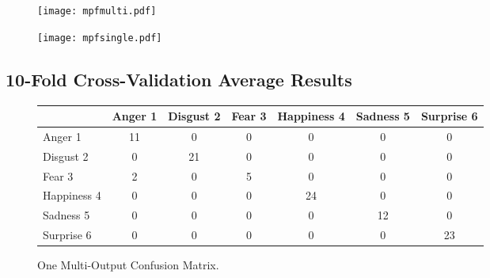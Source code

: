 \documentclass[a4paper,11pt]{article}
\begin{document}
 \begin{figure}[h]                                                               
 \begin{center}                                                                  
           \texttt{[image: mpfmulti.pdf]}                                       
 \end{center}                                                                    
 \end{figure} 
 
  \begin{figure}[h]                                                               
 \begin{center}                                                                  
           \texttt{[image: mpfsingle.pdf]}                                      
 \end{center}                                                                    
 \end{figure} 


\subsection{10-Fold Cross-Validation Average Results}


\begin{figure}[h]                                                               
\begin{center}                                                                  
     \begin{tabular}{ | l || c | c | c | c | c | c | }                           
     \hline                                                                      
           & Anger 1 & Disgust 2 & Fear 3 & Happiness 4 & Sadness 5 & Surprise 6 \\ \hline \hline
         Anger 1 		& 11 & 0 & 0 & 0 & 0 & 0 \\ \hline                               
         Disgust 2 		& 0 & 21 & 0 & 0 & 0 & 0 \\ \hline                            
         Fear 3 		& 2 & 0 & 5 & 0 & 0 & 0 \\ \hline                                
         Happiness 4 	& 0 & 0 & 0 & 24 & 0 & 0 \\ \hline                          
         Sadness 5 		& 0 & 0 & 0 & 0 & 12 & 0 \\ \hline                             
         Surprise 6 	& 0 & 0 & 0 & 0 & 0 & 23 \\ \hline                           
     \end{tabular}                                                               
     \caption{One Multi-Output Confusion Matrix.}
     \label{fig:oneConfusionMatrix}                                                 
\end{center}                                                                    
\end{figure}   
\end{document}
